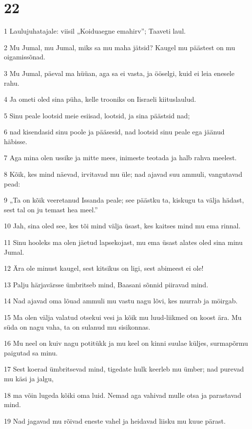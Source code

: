 \chapter{22}

\par 1 Laulujuhatajale: viisil „Koiduaegne emahirv”; Taaveti laul.
\par 2 Mu Jumal, mu Jumal, miks sa mu maha jätsid? Kaugel mu päästest on mu oigamissõnad.
\par 3 Mu Jumal, päeval ma hüüan, aga sa ei vasta, ja ööselgi, kuid ei leia enesele rahu.
\par 4 Ja ometi oled sina püha, kelle trooniks on Iisraeli kiituslaulud.
\par 5 Sinu peale lootsid meie esiisad, lootsid, ja sina päästsid nad;
\par 6 nad kisendasid sinu poole ja pääsesid, nad lootsid sinu peale ega jäänud häbisse.
\par 7 Aga mina olen ussike ja mitte mees, inimeste teotada ja halb rahva meelest.
\par 8 Kõik, kes mind näevad, irvitavad mu üle; nad ajavad suu ammuli, vangutavad pead:
\par 9 „Ta on kõik veeretanud Issanda peale; see päästku ta, kiskugu ta välja hädast, sest tal on ju temast hea meel.”
\par 10 Jah, sina oled see, kes tõi mind välja üsast, kes kaitses mind mu ema rinnal.
\par 11 Sinu hooleks ma olen jäetud lapsekojast, mu ema üsast alates oled sina minu Jumal.
\par 12 Ära ole minust kaugel, sest kitsikus on ligi, sest abimeest ei ole!
\par 13 Palju härjavärsse ümbritseb mind, Baasani sõnnid piiravad mind.
\par 14 Nad ajavad oma lõuad ammuli mu vastu nagu lõvi, kes murrab ja möirgab.
\par 15 Ma olen välja valatud otsekui vesi ja kõik mu luud-liikmed on koost ära. Mu süda on nagu vaha, ta on sulanud mu sisikonnas.
\par 16 Mu neel on kuiv nagu potitükk ja mu keel on kinni suulae küljes, surmapõrmu paigutad sa minu.
\par 17 Sest koerad ümbritsevad mind, tigedate hulk keerleb mu ümber; nad purevad mu käsi ja jalgu,
\par 18 ma võin lugeda kõiki oma luid. Nemad aga vahivad mulle otsa ja parastavad mind.
\par 19 Nad jagavad mu rõivad eneste vahel ja heidavad liisku mu kuue pärast.

